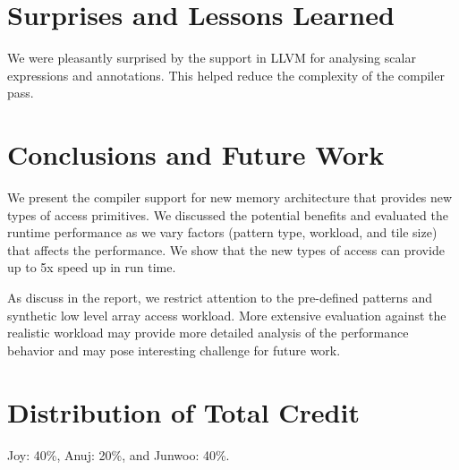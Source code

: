 \documentclass[letterpaper]{article}
\begin{document}
\begin{figure}[ht!]
    \label{fig:evaluation}
\end{figure}

\section{Surprises and Lessons Learned}
We were pleasantly surprised by the support in LLVM for analysing scalar expressions and annotations.
This helped reduce the complexity of the compiler pass.

\section{Conclusions and Future Work}

We present the compiler support for new memory architecture that provides new types of access primitives. We discussed the potential benefits and evaluated the runtime performance as we vary factors (pattern type, workload, and tile size) that affects the performance. We show that the new types of access can provide up to 5x speed up in run time. 

As discuss in the report, we restrict attention to the pre-defined patterns and synthetic low level array access workload. More extensive evaluation against the realistic workload may provide more detailed analysis of the performance behavior and may pose interesting challenge for future work. 


\section{Distribution of Total Credit}

Joy: 40\%, Anuj: 20\%, and Junwoo: 40\%.



\end{document}
